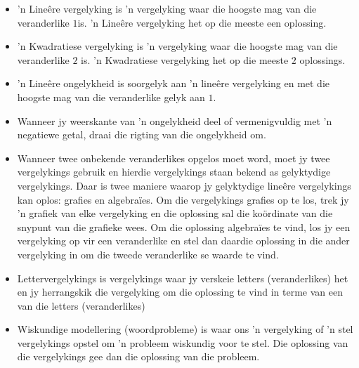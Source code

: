 \begin{itemize}[noitemsep]
\item ’n Lineêre vergelyking is ’n vergelyking waar die hoogste mag van die veranderlike $1$is. ’n Lineêre vergelyking het op die meeste een oplossing.
\item ’n Kwadratiese vergelyking is ’n vergelyking waar die hoogste mag van die veranderlike $2$ is. ’n Kwadratiese
vergelyking het op die meeste $2$ oplossings.
\item ’n Lineêre ongelykheid is soorgelyk aan ’n lineêre vergelyking en met die hoogste mag van die veranderlike
gelyk aan $1$.
\item Wanneer jy weerskante van ’n ongelykheid deel of vermenigvuldig met ’n negatiewe getal,
draai die rigting van die ongelykheid om. 
\item Wanneer twee onbekende veranderlikes opgelos moet word, moet jy twee vergelykings gebruik en hierdie vergelykings staan bekend as gelyktydige vergelykings. Daar is twee maniere waarop jy gelyktydige lineêre
vergelykings kan oplos: grafies en algebraïes. Om die vergelykings grafies op te los, trek jy ’n grafiek
van elke vergelyking en die oplossing sal die koördinate van die snypunt van die grafieke wees. Om die
oplossing algebraïes te vind, los jy een vergelyking op vir een veranderlike en stel dan daardie oplossing
in die ander vergelyking in om die tweede veranderlike se waarde te vind.
\item Lettervergelykings is vergelykings waar jy verskeie letters (veranderlikes) het en jy herrangskik die vergelyking om die oplossing te vind in terme van een van die letters (veranderlikes)
\item Wiskundige modellering (woordprobleme) is waar ons ’n vergelyking of ’n stel vergelykings opstel om ’n probleem wiskundig
voor te stel. Die oplossing van die vergelykings gee dan die oplossing van die probleem.
\end{itemize}

